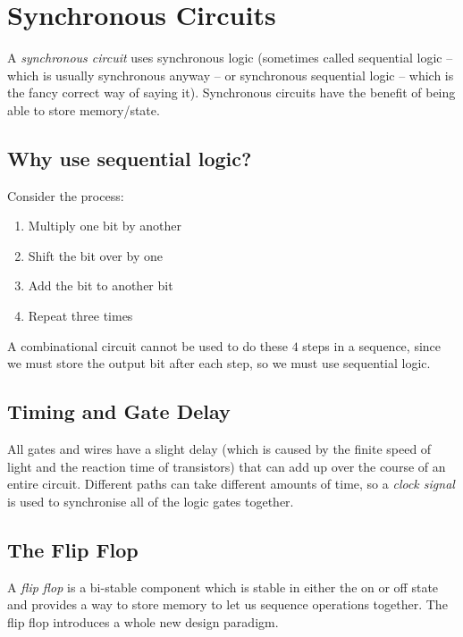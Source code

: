 \section{Synchronous Circuits}\label{sec:synchronous_circuits}

A \emph{synchronous circuit} uses synchronous logic (sometimes called sequential logic -- which is usually synchronous anyway -- or synchronous sequential logic -- which is the fancy correct way of saying it).
Synchronous circuits have the benefit of being able to store memory/state.


\subsection{Why use sequential logic?}\label{sub:why_use_sequential_logic_}

Consider the process:

\begin{enumerate}
	\item Multiply one bit by another
	\item Shift the bit over by one
	\item Add the bit to another bit
	\item Repeat three times
\end{enumerate}
%
A combinational circuit cannot be used to do these \(4\) steps in a sequence, since we must store the output bit after each step, so we must use sequential logic.

\subsection{Timing and Gate Delay}\label{sub:timing_and_gate_delay}

All gates and wires have a slight delay (which is caused by the finite speed of light and the reaction time of transistors) that can add up over the course of an entire circuit.
Different paths can take different amounts of time, so a \emph{clock signal} is used to synchronise all of the logic gates together.

\subsection{The Flip Flop}\label{sub:the_flip_flop}

A \emph{flip flop} is a bi-stable component which is stable in either the on or off state and provides a way to store memory to let us sequence operations together.
The flip flop introduces a whole new design paradigm.

